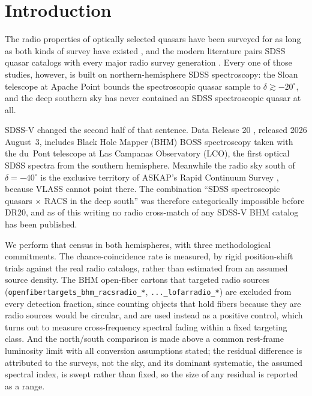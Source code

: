 \documentclass[twocolumn]{aastex631}
\newcommand{\code}[1]{\texttt{#1}}
\begin{document}

\section{Introduction}

The radio properties of optically selected quasars have been surveyed for as long as both
kinds of survey have existed \citep{kellermann1989, ivezic2002, condon1998}, and the modern
literature pairs SDSS quasar catalogs with every major radio survey generation
\citep[e.g.][]{arnaudova2024}. Every one of those studies, however, is built on
northern-hemisphere SDSS spectroscopy: the Sloan telescope at Apache Point bounds the
spectroscopic quasar sample to $\delta \gtrsim -20^\circ$, and the deep southern sky has
never contained an SDSS spectroscopic quasar at all.

SDSS-V \citep{kollmeier2025} changed the second half of that sentence. Data Release 20
\citep[DR20;][]{dr20}, released 2026 August~3, includes Black Hole Mapper (BHM) BOSS
spectroscopy taken with the du~Pont telescope at Las Campanas Observatory (LCO), the
first optical SDSS spectra from the southern hemisphere. Meanwhile the radio sky south of
$\delta = -40^\circ$ is the exclusive territory of ASKAP's Rapid Continuum Survey
\citep[RACS;][]{mcconnell2020}, because VLASS \citep{lacy2020} cannot point there. The
combination ``SDSS spectroscopic quasars $\times$ RACS in the deep south'' was therefore
categorically impossible before DR20, and as of this writing no radio cross-match of any
SDSS-V BHM catalog has been published.

We perform that census in both hemispheres, with three methodological commitments. The
chance-coincidence rate is measured, by rigid position-shift trials against the real radio
catalogs, rather than estimated from an assumed source density. The BHM open-fiber cartons
that targeted radio sources (\code{openfibertargets\_bhm\_racsradio\_*},
\code{...\_lofarradio\_*}) are excluded from every detection fraction, since counting
objects that hold fibers because they are radio sources would be circular, and are used
instead as a positive control, which turns out to measure cross-frequency spectral fading
within a fixed targeting class. And the north/south comparison is made above a common
rest-frame luminosity limit with all conversion assumptions stated; the residual difference
is attributed to the surveys, not the sky, and its dominant systematic, the assumed
spectral index, is swept rather than fixed, so the size of any residual is reported as a
range.
\end{document}
